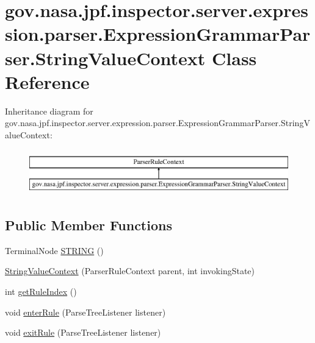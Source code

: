 \hypertarget{classgov_1_1nasa_1_1jpf_1_1inspector_1_1server_1_1expression_1_1parser_1_1_expression_grammar_parser_1_1_string_value_context}{}\section{gov.\+nasa.\+jpf.\+inspector.\+server.\+expression.\+parser.\+Expression\+Grammar\+Parser.\+String\+Value\+Context Class Reference}
\label{classgov_1_1nasa_1_1jpf_1_1inspector_1_1server_1_1expression_1_1parser_1_1_expression_grammar_parser_1_1_string_value_context}
Inheritance diagram for gov.\+nasa.\+jpf.\+inspector.\+server.\+expression.\+parser.\+Expression\+Grammar\+Parser.\+String\+Value\+Context\+:\begin{figure}[H]
\begin{center}
\leavevmode
\includegraphics[height=2.000000cm]{classgov_1_1nasa_1_1jpf_1_1inspector_1_1server_1_1expression_1_1parser_1_1_expression_grammar_parser_1_1_string_value_context}
\end{center}
\end{figure}
\subsection*{Public Member Functions}
\begin{DoxyCompactItemize}
\item 
Terminal\+Node \hyperlink{classgov_1_1nasa_1_1jpf_1_1inspector_1_1server_1_1expression_1_1parser_1_1_expression_grammar_parser_1_1_string_value_context_af9cd09b7d876a4c22ecf12d3adc3d552}{S\+T\+R\+I\+NG} ()
\item 
\hyperlink{classgov_1_1nasa_1_1jpf_1_1inspector_1_1server_1_1expression_1_1parser_1_1_expression_grammar_parser_1_1_string_value_context_a38bce229936c4e9cb519a05d643b940e}{String\+Value\+Context} (Parser\+Rule\+Context parent, int invoking\+State)
\item 
int \hyperlink{classgov_1_1nasa_1_1jpf_1_1inspector_1_1server_1_1expression_1_1parser_1_1_expression_grammar_parser_1_1_string_value_context_a643f2c197f486d356342a61bd06796f9}{get\+Rule\+Index} ()
\item 
void \hyperlink{classgov_1_1nasa_1_1jpf_1_1inspector_1_1server_1_1expression_1_1parser_1_1_expression_grammar_parser_1_1_string_value_context_a83b6df94a044ebe83d2e9d3cedd57b6e}{enter\+Rule} (Parse\+Tree\+Listener listener)
\item 
void \hyperlink{classgov_1_1nasa_1_1jpf_1_1inspector_1_1server_1_1expression_1_1parser_1_1_expression_grammar_parser_1_1_string_value_context_ad6f1db9f5c399e2bf8cc1c2ec51a32e2}{exit\+Rule} (Parse\+Tree\+Listener listener)
\end{DoxyCompactItemize}
